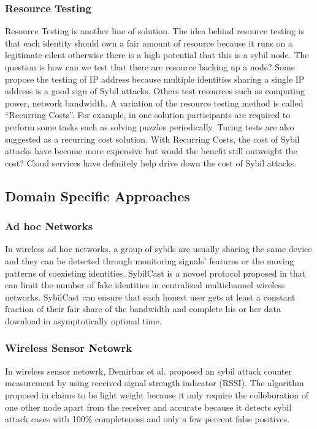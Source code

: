 \documentclass[conference]{IEEEtran}
\begin{document}
\subsubsection{Resource Testing}
Resource Testing is another line of solution. The idea behind resource testing is that each identity should own a fair amount of resource because it runs on a legitimate cilent otherwise there is a high potential that this is a sybil node. The question is how can we test that there are resource backing up a node? Some propose the testing of IP address because multiple identities sharing a single IP address is a good sign of Sybil attacks. Others test resources such as computing power, network bandwidth. A variation of the resource testing method is called “Recurring Costs”. For example, in one solution participants are required to perform some tasks such as solving puzzles\cite{Borisov06CPS} periodically. Turing tests are also suggested as a recurring cost solution\cite{Ahn03CUH}. With Recurring Costs, the cost of Sybil attacks have become more expensive but would the benefit still outweight the cost? Cloud services have definitely help drive down the cost of Sybil attacks.

\subsection{Domain Specific Approaches}
\subsubsection{Ad hoc Networks}

In wireless ad hoc networks, a group of sybils are usually sharing the same device and they can be detected through monitoring signals’ features or the moving patterns of coexisting identities. SybilCast is a novoel protocol proposed in \cite{Zheng_thwartingsybil} that can limit the number of 
fake identities in centralized multichannel wireless networks. SybilCast can ensure that each honest user gets at least a constant fraction of their fair share of the bandwidth and complete his or her data download in asymptotically optimal time.

\subsubsection{Wireless Sensor Netowrk}
In wireless sensor netowrk, Demirbas et al. proposed an sybil attack counter measurement by using received signal strength indicator (RSSI). The algorithm proposed in \cite{Demirbas06RSSI} claims to be light weight because it only require the colloboration of one other node apart from the receiver and accurate because it detects sybil attack cases with 100\% completeness and only a few percent false positives.
\cite{Demirbas06RSSI}
\end{document}
